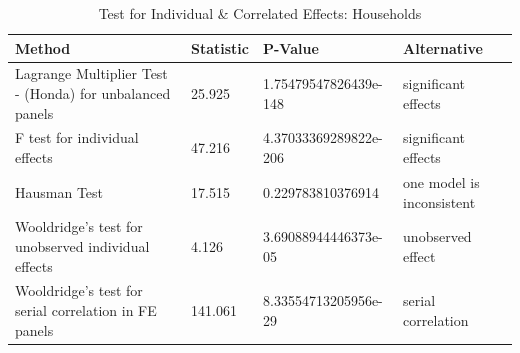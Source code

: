 \begin{table}[ht]
\centering
\caption{ Test for Individual & Correlated Effects: Households} 
\begingroup\small
\begin{tabular}{llll}
  \toprule
Method & Statistic & P-Value & Alternative \\ 
  \midrule
Lagrange Multiplier Test -  (Honda) for unbalanced panels & 25.925 & 1.75479547826439e-148 & significant effects \\ 
  F test for individual effects & 47.216 & 4.37033369289822e-206 & significant effects \\ 
  Hausman Test & 17.515 & 0.229783810376914 & one model is inconsistent \\ 
  Wooldridge's test for unobserved individual effects & 4.126 & 3.69088944446373e-05 & unobserved effect \\ 
  Wooldridge's test for serial correlation in FE panels & 141.061 & 8.33554713205956e-29 & serial correlation \\ 
   \bottomrule
\end{tabular}
\endgroup
\end{table}

